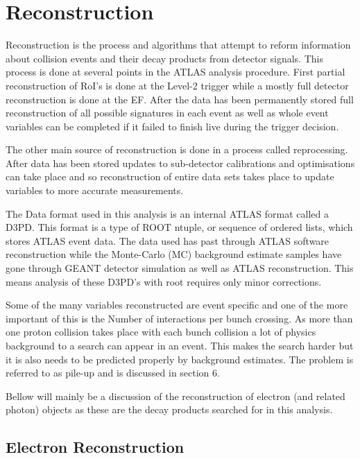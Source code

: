 \chapter{Reconstruction}

Reconstruction is the process and algorithms that attempt to reform information about collision events and their decay products from detector signals. This process is done at several points in the ATLAS analysis procedure. First partial reconstruction of RoI's is done at the Level-2 trigger while a mostly full detector reconstruction is done at the EF. After the data has been permanently stored full reconstruction of all possible signatures in each event as well as whole event variables can be completed if it failed to finish live during the trigger decision.

The other main source of reconstruction is done in a process called reprocessing. After data has been stored updates to sub-detector calibrations and optimisations can take place and so reconstruction of entire data sets takes place to update variables to more accurate measurements. 

The Data format used in this analysis is an internal ATLAS format called a D3PD. This format is a type of ROOT \cite{} ntuple, or sequence of ordered lists, which stores ATLAS event data. The data used has past through ATLAS software reconstruction while the Monte-Carlo (MC) background estimate samples have gone through GEANT \cite{} detector simulation as well as ATLAS reconstruction. This means analysis of these D3PD's with root requires only minor corrections.


Some of the many variables reconstructed are event specific and one of the more important of this is the Number of interactions per bunch crossing. As more than one proton collision takes place with each bunch collision a lot of physics background to a search can appear in an event. This makes the search harder but it is also needs to be predicted properly by background estimates. The problem is referred to as pile-up and is discussed in section 6.

Bellow will mainly be a discussion of the reconstruction of electron (and related photon) objects as these are the decay products searched for in this analysis.



\section{Electron Reconstruction}
\label{sec:ReconElec}

